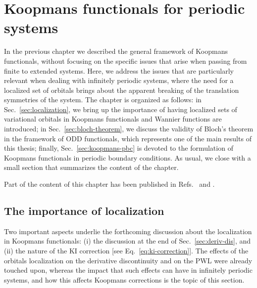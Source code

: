 \cleardoublepage
\chapter{Koopmans functionals for periodic systems\label{ch:koopmans-periodic}}
In the previous chapter we described the general framework of Koopmans functionals, without focusing on the specific issues that arise when passing from finite to extended systems. Here, we address the issues that are particularly relevant when dealing with infinitely periodic systems, where the need for a localized set of orbitals brings about the apparent breaking of the translation symmetries of the system. The chapter is organized as follows: in Sec.~\ref{sec:localization}, we bring up the importance of having localized sets of variational orbitals in Koopmans functionals and Wannier functions are introduced; in Sec.~\ref{sec:bloch-theorem}, we discuss the validity of Bloch's theorem in the framework of ODD functionals, which represents one of the main results of this thesis; finally, Sec.~\ref{sec:koopmans-pbc} is devoted to the formulation of Koopmans functionals in periodic boundary conditions. As usual, we close with a small section that summarizes the content of the chapter.

Part of the content of this chapter has been published in Refs.~\cite{de_gennaro_blochs_2022} and \cite{colonna_koopmans_2022}.

\clearpage
\section{The importance of localization\label{sec:localization}}
Two important aspects underlie the forthcoming discussion about the localization in Koopmans functionals: (i) the discussion at the end of Sec.~\ref{sec:deriv-dis}, and (ii) the nature of the KI correction [see Eq.~\eqref{eq:ki-correction}]. The effects of the orbitals localization on the derivative discontinuity and on the PWL were already touched upon, whereas the impact that such effects can have in infinitely periodic systems, and how this affects Koopmans corrections is the topic of this section.

